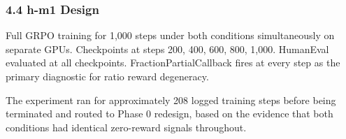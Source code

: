 \subsubsection{4.4 h-m1 Design}

Full GRPO training for 1,000 steps under both conditions simultaneously on separate GPUs. Checkpoints at steps 200, 400, 600, 800, 1,000. HumanEval evaluated at all checkpoints. FractionPartialCallback fires at every step as the primary diagnostic for ratio reward degeneracy.

The experiment ran for approximately 208 logged training steps before being terminated and routed to Phase 0 redesign, based on the evidence that both conditions had identical zero-reward signals throughout.

